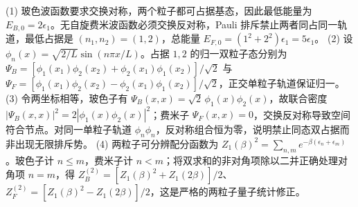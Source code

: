 (1) 玻色波函数要求交换对称，两个粒子都可占据基态，因此最低能量为 \(E_{B,0}=2\epsilon_1\)。无自旋费米波函数必须交换反对称，Pauli 排斥禁止两者同占同一轨道，最低占据是 \((n_1,n_2)=(1,2)\)，总能量 \(E_{F,0}=(1^2+2^2)\epsilon_1=5\epsilon_1\)。
(2) 设 \(\phi_n(x)=\sqrt{2/L}\sin(n\pi x/L)\)。占据 \(1,2\) 的归一双粒子态分别为 \(\Psi_B=[\phi_1(x_1)\phi_2(x_2)+\phi_2(x_1)\phi_1(x_2)]/\sqrt2\) 与 \(\Psi_F=[\phi_1(x_1)\phi_2(x_2)-\phi_2(x_1)\phi_1(x_2)]/\sqrt2\)，正交单粒子轨道保证归一。
(3) 令两坐标相等，玻色子有 \(\Psi_B(x,x)=\sqrt2\,\phi_1(x)\phi_2(x)\)，故联合密度 \(|\Psi_B(x,x)|^2=2|\phi_1(x)\phi_2(x)|^2\)；费米子 \(\Psi_F(x,x)=0\)，交换反对称导致空间符合节点。对同一单粒子轨道 \(\phi_n\phi_n\)，反对称组合恒为零，说明禁止同态双占据而非出现无限排斥势。
(4) 两粒子可分辨配分函数为 \(Z_1(\beta)^2=\sum_{n,m}e^{-\beta(\epsilon_n+\epsilon_m)}\)。玻色子计 \(n\le m\)，费米子计 \(n<m\)；将双求和的非对角项除以二并正确处理对角项 \(n=m\)，得 \(Z_B^{(2)}=[Z_1(\beta)^2+Z_1(2\beta)]/2\)、\(Z_F^{(2)}=[Z_1(\beta)^2-Z_1(2\beta)]/2\)，这是严格的两粒子量子统计修正。
